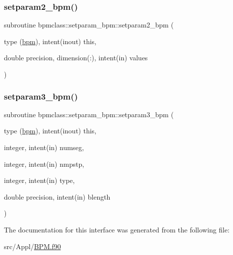 \mbox{\label{interfacebpmclass_1_1setparam__bpm_aae11500cfaecf01936e220a8eb0327b8}} 
\subsubsection{\texorpdfstring{setparam2\_bpm()}{setparam2\_bpm()}}
{\footnotesize\ttfamily subroutine bpmclass\+::setparam\+\_\+bpm\+::setparam2\+\_\+bpm (\begin{DoxyParamCaption}\item[{type (\mbox{\hyperlink{namespacebpmclass_structbpmclass_1_1bpm}{bpm}}), intent(inout)}]{this,  }\item[{double precision, dimension(\+:), intent(in)}]{values }\end{DoxyParamCaption})}

\mbox{\label{interfacebpmclass_1_1setparam__bpm_a7058c566d7dd0e3bb6480d1f50c9604b}} 
\subsubsection{\texorpdfstring{setparam3\_bpm()}{setparam3\_bpm()}}
{\footnotesize\ttfamily subroutine bpmclass\+::setparam\+\_\+bpm\+::setparam3\+\_\+bpm (\begin{DoxyParamCaption}\item[{type (\mbox{\hyperlink{namespacebpmclass_structbpmclass_1_1bpm}{bpm}}), intent(inout)}]{this,  }\item[{integer, intent(in)}]{numseg,  }\item[{integer, intent(in)}]{nmpstp,  }\item[{integer, intent(in)}]{type,  }\item[{double precision, intent(in)}]{blength }\end{DoxyParamCaption})}



The documentation for this interface was generated from the following file\+:\begin{DoxyCompactItemize}
\item 
src/\+Appl/\mbox{\hyperlink{_b_p_m_8f90}{B\+P\+M.\+f90}}\end{DoxyCompactItemize}
